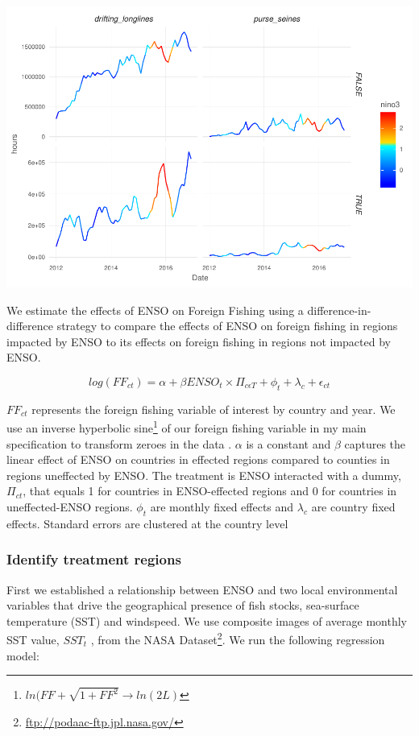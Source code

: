 \documentclass[]{article}
\let\rmarkdownfootnote\footnote%
\def\footnote{\protect\rmarkdownfootnote}
\begin{document}
\includegraphics{Oremus_Villasenor-Derbez_files/figure-latex/unnamed-chunk-6-1.pdf}

We estimate the effects of ENSO on Foreign Fishing using a
difference-in-difference strategy to compare the effects of ENSO on
foreign fishing in regions impacted by ENSO to its effects on foreign
fishing in regions not impacted by ENSO.

\[log(FF_{ct}) = \alpha + \beta ENSO_t \times \Pi_{c\epsilon T} + \phi_t + \lambda_c + \epsilon_{ct}\]

\(FF_{ct}\) represents the foreign fishing variable of interest by
country and year. We use an inverse hyperbolic sine\footnote{\(ln(FF + \sqrt{1 + FF^2} \rightarrow ln(2L)\)}
of our foreign fishing variable in my main specification to transform
zeroes in the data \citep{burbidge_1988,card_2017}. \(\alpha\) is a
constant and \(\beta\) captures the linear effect of ENSO on countries
in effected regions compared to counties in regions uneffected by ENSO.
The treatment is ENSO interacted with a dummy, \(\Pi_{ct}\), that equals
1 for countries in ENSO-effected regions and 0 for countries in
uneffected-ENSO regions. \(\phi_t\) are monthly fixed effects and
\(\lambda_c\) are country fixed effects. Standard errors are clustered
at the country level

\subsubsection{Identify treatment
regions}\label{identify-treatment-regions}

First we established a relationship between ENSO and two local
environmental variables that drive the geographical presence of fish
stocks, sea-surface temperature (SST) and windspeed. We use composite
images of average monthly SST value, \(SST_t\) , from the NASA
Dataset\footnote{\url{ftp://podaac-ftp.jpl.nasa.gov/}}. We run the
following regression model:
\end{document}

